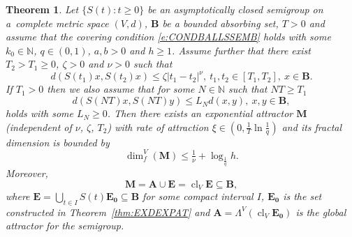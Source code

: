 \documentclass[10pt,a4paper]{amsart}
\newtheorem{thm}{Theorem}
\newcommand{\N}{\mathbb{N}}
\newcommand{\abs}[1]{\left\vert#1\right\vert}
\newcommand{\cl}{\operatorname{cl}}
\newcommand{\dimf}{\operatorname{dim}_{f}}
\renewcommand{\geq}{\geqslant}
\renewcommand{\leq}{\leqslant}
\begin{document}
\begin{thm}\label{thm:SEM3}
Let $\{S(t)\colon t\geq 0\}$ be an asymptotically closed semigroup on a~complete metric space $(V,d)$, $\mathbf{B}$ be a bounded absorbing set, $T>0$ and assume
that the covering condition \eqref{e:CONDBALLSSEMB}
holds with some $k_0\in\N$, $q\in(0,1)$, $a,b>0$ and $h\geq 1$.
Assume further that there exist $T_2>T_1\geq 0$,
$\zeta>0$ and $\nu>0$ such that
\begin{equation}\label{e:TIMEHOLDER}
d(S(t_1)x,S(t_2)x)\leq\zeta\abs{t_1-t_2}^{\nu},\ t_1,t_2\in[T_1,T_2],\ x\in\mathbf{B}.
\end{equation}
If $T_1>0$ then we also assume that for some $N\in\N$ such that $NT\geq T_1$
\begin{equation}\label{e:LIPTSEMN}
d(S(NT)x,S(NT)y)\leq L_{N}d(x,y),\ x,y\in \mathbf{B},
\end{equation}
holds with some $L_{N}\geq 0$. Then there exists an exponential attractor
$\mathbf{M}$ (independent of $\nu$, $\zeta$, $T_2$) with rate of attraction $\xi\in(0,\frac{1}{T}\ln\frac{1}{q})$
and its fractal dimension is bounded by
\begin{equation*}
\dimf^{V}(\mathbf{M})\leq\tfrac{1}{\nu}+\log_{\frac{1}{q}}h.
\end{equation*}
Moreover,
\begin{equation*}
\mathbf{M}=\mathbf{A}\cup\mathbf{E}=\cl_{V}\mathbf{E}\subseteq\mathbf{B},
\end{equation*}
where $\mathbf{E}=\bigcup_{t\in I}S(t)\mathbf{E_0} \subseteq\mathbf{B}$ for some compact interval $I$, $\mathbf{E_0}$ is the set constructed in Theorem~\ref{thm:EXDEXPAT} and $\mathbf{A}=\Lambda^{V}(\cl_{V}\mathbf{E_0})$ is the global attractor for the semigroup.
\end{thm}
\end{document}
